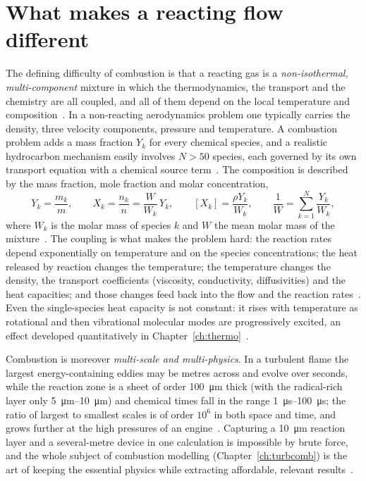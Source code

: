 \section{What makes a reacting flow different}

The defining difficulty of combustion is that a reacting gas is a \emph{non-isothermal, multi-component} mixture in which the thermodynamics, the transport and the chemistry are all coupled, and all of them depend on the local temperature and composition~\cite{lecture1,Langella_LectureNotes}. In a non-reacting aerodynamics problem one typically carries the density, three velocity components, pressure and temperature. A combustion problem adds a mass fraction $Y_k$ for every chemical species, and a realistic hydrocarbon mechanism easily involves $N>50$ species, each governed by its own transport equation with a chemical source term~\cite{lecture1}. The composition is described by the mass fraction, mole fraction and molar concentration,
\begin{equation}
Y_k=\frac{m_k}{m},\qquad X_k=\frac{n_k}{n}=\frac{W}{W_k}\,Y_k,\qquad [X_k]=\frac{\rho Y_k}{W_k},
\qquad \frac{1}{W}=\sum_{k=1}^{N}\frac{Y_k}{W_k},
\label{eq:composition}
\end{equation}
where $W_k$ is the molar mass of species $k$ and $W$ the mean molar mass of the mixture~\cite{lecture1,warnatz2006combustion}. The coupling is what makes the problem hard: the reaction rates depend exponentially on temperature and on the species concentrations; the heat released by reaction changes the temperature; the temperature changes the density, the transport coefficients (viscosity, conductivity, diffusivities) and the heat capacities; and those changes feed back into the flow and the reaction rates~\cite{lecture1,Langella_LectureNotes}. Even the single-species heat capacity is not constant: it rises with temperature as rotational and then vibrational molecular modes are progressively excited, an effect developed quantitatively in Chapter~\ref{ch:thermo}~\cite{lecture1,warnatz2006combustion}.

Combustion is moreover \emph{multi-scale and multi-physics}. In a turbulent flame the largest energy-containing eddies may be metres across and evolve over seconds, while the reaction zone is a sheet of order \SI{100}{\micro m} thick (with the radical-rich layer only \SIrange{5}{10}{\micro m}) and chemical times fall in the range \SIrange{1}{100}{\micro s}; the ratio of largest to smallest scales is of order $10^{6}$ in both space and time, and grows further at the high pressures of an engine~\cite{lecture4}. Capturing a \SI{10}{\micro m} reaction layer and a several-metre device in one calculation is impossible by brute force, and the whole subject of combustion modelling (Chapter~\ref{ch:turbcomb}) is the art of keeping the essential physics while extracting affordable, relevant results~\cite{lecture4}.

